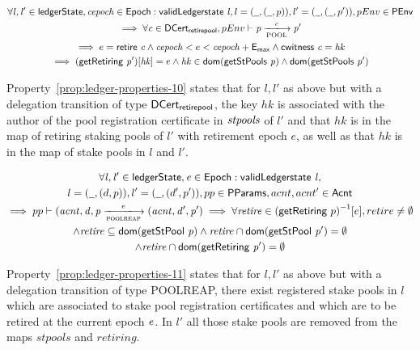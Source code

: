 \begin{property}
  \begin{multline*}
    \forall \var{l}, \var{l'} \in \ledgerState, \var{cepoch} \in \Epoch:
    \applyFun{validLedgerstate}{l},
    l = (\wcard, (\wcard,p)), l' = (\wcard, (\wcard,p')), pEnv\in\PEnv \\
    \implies \forall \var{c} \in \DCertRetirePool, pEnv\vdash\var{p}
    \trans{POOL}{c} \var{p'} \\ \implies e = \applyFun{retire}{c} \wedge
    \var{cepoch} < e < \var{cepoch} + \emax \wedge \applyFun{cwitness}{c} =
    \var{hk}\\ \implies (\applyFun{getRetiring}{p'})[\var{hk}] = e \wedge
    \var{hk} \in
    \fun{dom}(\applyFun{getStPools}{p})\wedge\fun{dom}(\applyFun{getStPools}{p'}
    )
  \end{multline*}
  \label{prop:ledger-properties-10}
\end{property}

Property~\ref{prop:ledger-properties-10} states that for $l, l'$ as above but
with a delegation transition of type $\mathsf{DCert_{retirepool}}$, the key $hk$ is
associated with the author of the pool registration certificate in
$\mathit{stpools}$ of $l'$ and that $hk$ is in the map of retiring staking pools of
$l'$ with retirement epoch $e$, as well as that $hk$ is in the map of stake
pools in $l$ and $l'$.

\begin{property}
  \begin{multline*}
    \forall \var{l}, \var{l'} \in \ledgerState, \var{e} \in \Epoch:
    \applyFun{validLedgerstate}{l},\\
    l = (\wcard, (d, p)), l' = (\wcard, (d', p')), pp\in\PParams, acnt, acnt'\in\Acnt \\
    \implies pp\vdash\var{(acnt, d, p} \trans{poolreap}{e} \var{(acnt, d', p')}
    \implies \forall \var{retire}\in{(\fun{getRetiring}~p)}^{-1}[e], retire \neq
    \emptyset \\ \wedge \var{retire} \subseteq
    \fun{dom}(\applyFun{getStPool}{p}) \wedge
    \var{retire} \cap\fun{dom}(\applyFun{getStPool}{p'})=\emptyset \\
    \wedge\var{retire} \cap \fun{dom}(\applyFun{getRetiring}{p'}) = \emptyset
  \end{multline*}
  \label{prop:ledger-properties-11}
\end{property}

Property~\ref{prop:ledger-properties-11} states that for $l, l'$ as above but
with a delegation transition of type POOLREAP, there exist registered stake
pools in $l$ which are associated to stake pool registration certificates and
which are to be retired at the current epoch $\mathit{e}$. In $l'$ all those stake
pools are removed from the maps $stpools$ and $retiring$.

